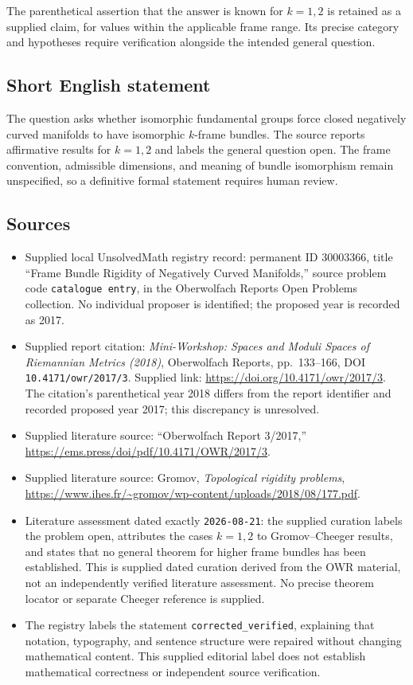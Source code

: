 \documentclass[11pt]{article}
\begin{document}
The parenthetical assertion that the answer is known for \(k=1,2\) is retained as a supplied claim, for values within the applicable frame range. Its precise category and hypotheses require verification alongside the intended general question.
\subsection{Short English statement}
The question asks whether isomorphic fundamental groups force closed negatively curved manifolds to have isomorphic \(k\)-frame bundles. The source reports affirmative results for \(k=1,2\) and labels the general question open. The frame convention, admissible dimensions, and meaning of bundle isomorphism remain unspecified, so a definitive formal statement requires human review.
\subsection{Sources}
\begin{itemize}
\item Supplied local UnsolvedMath registry record: permanent ID \(30003366\), title ``Frame Bundle Rigidity of Negatively Curved Manifolds,'' source problem code \texttt{catalogue entry}, in the Oberwolfach Reports Open Problems collection. No individual proposer is identified; the proposed year is recorded as 2017.
\item Supplied report citation: \emph{Mini-Workshop: Spaces and Moduli Spaces of Riemannian Metrics (2018)}, Oberwolfach Reports, pp.~133--166, DOI \texttt{10.4171/owr/2017/3}. Supplied link: \url{https://doi.org/10.4171/owr/2017/3}. The citation's parenthetical year 2018 differs from the report identifier and recorded proposed year 2017; this discrepancy is unresolved.
\item Supplied literature source: ``Oberwolfach Report 3/2017,'' \url{https://ems.press/doi/pdf/10.4171/OWR/2017/3}.
\item Supplied literature source: Gromov, \emph{Topological rigidity problems}, \url{https://www.ihes.fr/~gromov/wp-content/uploads/2018/08/177.pdf}.
\item Literature assessment dated exactly \texttt{2026-08-21}: the supplied curation labels the problem open, attributes the cases \(k=1,2\) to Gromov--Cheeger results, and states that no general theorem for higher frame bundles has been established. This is supplied dated curation derived from the OWR material, not an independently verified literature assessment. No precise theorem locator or separate Cheeger reference is supplied.
\item The registry labels the statement \texttt{corrected\_verified}, explaining that notation, typography, and sentence structure were repaired without changing mathematical content. This supplied editorial label does not establish mathematical correctness or independent source verification.
\end{itemize}
\end{document}
